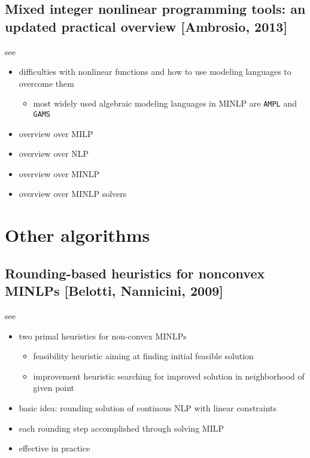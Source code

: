 \documentclass{article}
\begin{document}
\subsection{Mixed integer nonlinear programming tools: an updated practical overview [Ambrosio, 2013]}
see \cite{d2013mixed}
\begin{itemize}
\item difficulties with nonlinear functions and how to use modeling languages to overcome them
	\begin{itemize}
	\item most widely used algebraic modeling languages in MINLP are \texttt{AMPL} and \texttt{GAMS}
	\end{itemize}
\item overview over MILP
\item overview over NLP
\item overview over MINLP
\item overview over MINLP solvers
\end{itemize}

\section{Other algorithms}
\subsection{Rounding-based heuristics for nonconvex MINLPs [Belotti, Nannicini, 2009]}
see \cite{nannicini2009rounding}
\begin{itemize}
\item two primal heuristics for non-convex MINLPs
	\begin{itemize}
	\item feasibility heuristic aiming at finding initial feasible solution
	\item improvement heuristic searching for improved solution in neighborhood of given point
	\end{itemize}
\item basic idea: rounding solution of continous NLP with linear constraints
\item each rounding step accomplished through solving MILP
\item effective in practice
\end{itemize}

{}

\end{document}
